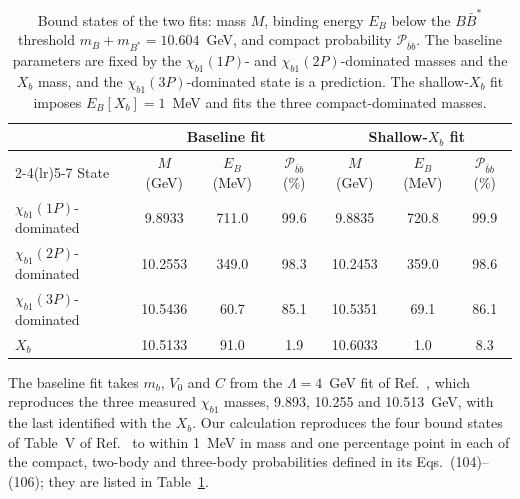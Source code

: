 \begin{table}[ht]
\centering
\caption{Bound states of the two fits: mass $M$, binding energy $E_B$ below
the $B\bar B^*$ threshold $m_B+m_{B^*}=10.604$~GeV, and compact probability
$\mathcal P_{\bar bb}$. The baseline parameters are fixed by the
$\chi_{b1}(1P)$- and $\chi_{b1}(2P)$-dominated masses and the $X_b$ mass, and
the $\chi_{b1}(3P)$-dominated state is a prediction. The shallow-$X_b$ fit
imposes $E_B[X_b]=1$~MeV and fits the three compact-dominated masses.}
\label{tab:states}
\begin{tabular}{lcccccc}
\toprule
& \multicolumn{3}{c}{Baseline fit} & \multicolumn{3}{c}{Shallow-$X_b$ fit}\\
\cmidrule(lr){2-4}\cmidrule(lr){5-7}
State & $M$ (GeV) & $E_B$ (MeV) & $\mathcal P_{\bar bb}$ (\%) &
$M$ (GeV) & $E_B$ (MeV) & $\mathcal P_{\bar bb}$ (\%)\\
\midrule
$\chi_{b1}(1P)$-dominated & 9.8933 & 711.0 & 99.6 & 9.8835 & 720.8 & 99.9\\
$\chi_{b1}(2P)$-dominated & 10.2553 & 349.0 & 98.3 & 10.2453 & 359.0 & 98.6\\
$\chi_{b1}(3P)$-dominated & 10.5436 & 60.7 & 85.1 & 10.5351 & 69.1 & 86.1\\
$X_b$ & 10.5133 & 91.0 & 1.9 & 10.6033 & 1.0 & 8.3\\
\bottomrule
\end{tabular}
\end{table}

The baseline fit takes $m_b$, $V_0$ and $C$ from the $\Lambda=4$~GeV fit of
Ref.~\cite{Zhang:2026iyr}, which reproduces the three measured $\chi_{b1}$
masses, 9.893, 10.255 and 10.513~GeV, with the last identified with the
$X_b$.
Our calculation reproduces the four bound states of Table~V of
Ref.~\cite{Zhang:2026iyr} to within 1~MeV in mass and one percentage point
in each of the compact, two-body and three-body probabilities defined in its
Eqs.~(104)--(106); they are listed in Table~\ref{tab:states}.

